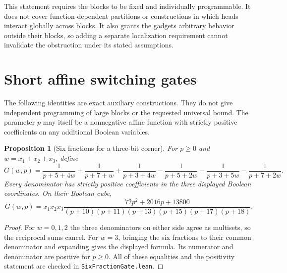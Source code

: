 \documentclass[11pt]{article}
\newtheorem{proposition}{Proposition}
\begin{document}
This statement requires the blocks to be fixed and individually
programmable. It does not cover function-dependent partitions or
constructions in which heads interact globally across blocks. It
also grants the gadgets arbitrary behavior outside their blocks, so
adding a separate localization requirement cannot invalidate the
obstruction under its stated assumptions.

\section{Short affine switching gates}

The following identities are exact auxiliary constructions. They do not
give independent programming of large blocks or the requested universal
bound. The parameter $p$ may itself be a nonnegative affine function
with strictly positive coefficients on any additional Boolean variables.

\begin{proposition}[Six fractions for a three-bit corner]
For $p\geq0$ and $w=x_1+x_2+x_3$, define
\[
 G(w,p)=\frac1{p+5+4w}+\frac1{p+7+w}+\frac1{p+3+4w}
       -\frac1{p+5+2w}-\frac1{p+3+5w}-\frac1{p+7+2w}.
\]
Every denominator has strictly positive coefficients in the three
displayed Boolean coordinates. On their Boolean cube,
\[
 G(w,p)=x_1x_2x_3
 \frac{72p^2+2016p+13800}
 {(p+10)(p+11)(p+13)(p+15)(p+17)(p+18)}.
\]
\end{proposition}
\begin{proof}
For $w=0,1,2$ the three denominators on either side agree as multisets,
so the reciprocal sums cancel. For $w=3$, bringing the six fractions
to their common denominator and expanding gives the displayed formula.
Its numerator and denominator are positive for $p\geq0$.
All of these equalities and the positivity statement are checked in
\texttt{SixFractionGate.lean}.
\end{proof}
\end{document}

